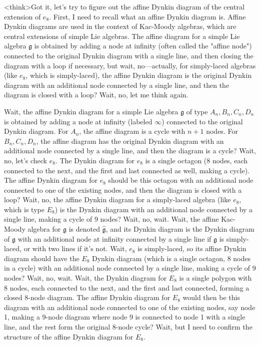 <think>Got it, let's try to figure out the affine Dynkin diagram of the central extension of \( e_8 \). First, I need to recall what an affine Dynkin diagram is. Affine Dynkin diagrams are used in the context of Kac-Moody algebras, which are central extensions of simple Lie algebras. The affine diagram for a simple Lie algebra \( \mathfrak{g} \) is obtained by adding a node at infinity (often called the "affine node") connected to the original Dynkin diagram with a single line, and then closing the diagram with a loop if necessary, but wait, no—actually, for simply-laced algebras (like \( e_8 \), which is simply-laced), the affine Dynkin diagram is the original Dynkin diagram with an additional node connected by a single line, and then the diagram is closed with a loop? Wait, no, let me think again.

Wait, the affine Dynkin diagram for a simple Lie algebra \( \mathfrak{g} \) of type \( A_n, B_n, C_n, D_n \) is obtained by adding a node at infinity (labeled \( \infty \)) connected to the original Dynkin diagram. For \( A_n \), the affine diagram is a cycle with \( n+1 \) nodes. For \( B_n, C_n, D_n \), the affine diagram has the original Dynkin diagram with an additional node connected by a single line, and then the diagram is a cycle? Wait, no, let's check \( e_8 \). The Dynkin diagram for \( e_8 \) is a single octagon (8 nodes, each connected to the next, and the first and last connected as well, making a cycle). The affine Dynkin diagram for \( e_8 \) should be this octagon with an additional node connected to one of the existing nodes, and then the diagram is closed with a loop? Wait, no, the affine Dynkin diagram for a simply-laced algebra (like \( e_8 \), which is type \( E_8 \)) is the Dynkin diagram with an additional node connected by a single line, making a cycle of 9 nodes? Wait, no, wait. Wait, the affine Kac-Moody algebra for \( \mathfrak{g} \) is denoted \( \hat{\mathfrak{g}} \), and its Dynkin diagram is the Dynkin diagram of \( \mathfrak{g} \) with an additional node at infinity connected by a single line if \( \mathfrak{g} \) is simply-laced, or with two lines if it's not. Wait, \( e_8 \) is simply-laced, so its affine Dynkin diagram should have the \( E_8 \) Dynkin diagram (which is a single octagon, 8 nodes in a cycle) with an additional node connected by a single line, making a cycle of 9 nodes? Wait, no, wait. Wait, the Dynkin diagram for \( E_8 \) is a single polygon with 8 nodes, each connected to the next, and the first and last connected, forming a closed 8-node diagram. The affine Dynkin diagram for \( E_8 \) would then be this diagram with an additional node connected to one of the existing nodes, say node 1, making a 9-node diagram where node 9 is connected to node 1 with a single line, and the rest form the original 8-node cycle? Wait, but I need to confirm the structure of the affine Dynkin diagram for \( E_8 \).

